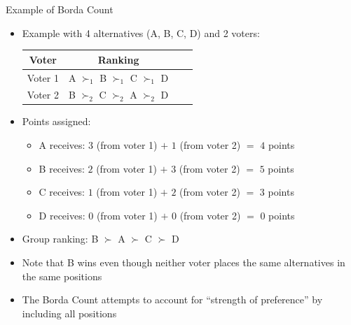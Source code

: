 \documentclass[10pt,handout]{beamer}
\begin{document}
\begin{frame}{Example of Borda Count}
  \begin{itemize}
    \item Example with 4 alternatives (A, B, C, D) and 2 voters:
      \begin{table}
        \center
        \begin{tabular}{cccc}
          \toprule
          \textbf{Voter} & \textbf{Ranking} \\
          \midrule
          Voter 1 & A $\succ_1$ B $\succ_1$ C $\succ_1$ D \\
          Voter 2 & B $\succ_2$ C $\succ_2$ A $\succ_2$ D \\
          \bottomrule
        \end{tabular}
      \end{table}
    \item Points assigned:
      \begin{itemize}
        \item A receives: $3$ (from voter 1) $+$ $1$ (from voter 2) $=$ $4$ points
        \item B receives: $2$ (from voter 1) $+$ $3$ (from voter 2) $=$ $5$ points
        \item C receives: $1$ (from voter 1) $+$ $2$ (from voter 2) $=$ $3$ points
        \item D receives: $0$ (from voter 1) $+$ $0$ (from voter 2) $=$ $0$ points
      \end{itemize}
    \item Group ranking: B $\succ$ A $\succ$ C $\succ$ D
    \item Note that B wins even though neither voter places the same alternatives in the same positions
    \item The Borda Count attempts to account for ``strength of preference'' by including all positions
  \end{itemize}
\end{frame}
\end{document}
